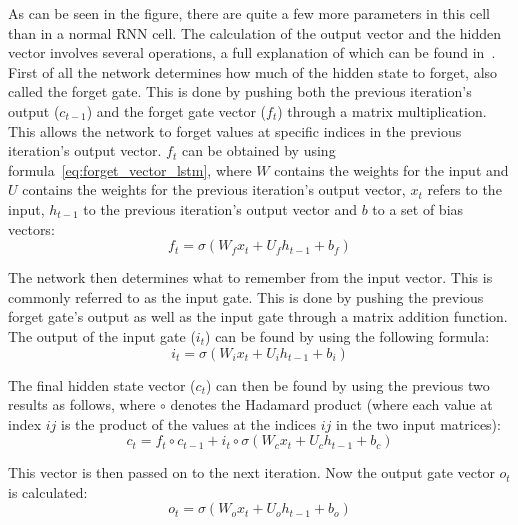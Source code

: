             As can be seen in the figure, there are quite a few more parameters in this cell than in a normal RNN cell. 
            The calculation of the output vector and the hidden vector involves several operations, a full explanation of which can be found in~\cite{olah2015understanding}. 
            First of all the network determines how much of the hidden state to forget, also called the forget gate. 
            This is done by pushing both the previous iteration's output (\(c_{t-1}\)) and the forget gate vector (\(f_t\)) through a matrix multiplication. 
            This allows the network to forget values at specific indices in the previous iteration's output vector. 
            \(f_t\) can be obtained by using formula~\ref{eq:forget_vector_lstm}, where \(W\) contains the weights for the input and \(U\) contains the weights for the previous iteration's output vector, \(x_t\) refers to the input, \(h_{t-1}\) to the previous iteration's output vector and \(b\) to a set of bias vectors:
            \begin{equation} \label{eq:forget_vector_lstm}
                f_t = \sigma(W_f x_t + U_f h_{t-1} + b_f)
            \end{equation}

            The network then determines what to remember from the input vector.
            This is commonly referred to as the input gate. 
            This is done by pushing the previous forget gate's output as well as the input gate through a matrix addition function. 
            The output of the input gate (\(i_t\)) can be found by using the following formula:
            \begin{equation} \label{eq:input_vector_lstm}
                i_t = \sigma(W_i x_t + U_i h_{t-1} + b_i)
            \end{equation}

            The final hidden state vector (\(c_t\)) can then be found by using the previous two results as follows, where \(\circ \) denotes the Hadamard product (where each value at index \(ij\) is the product of the values at the indices \(ij\) in the two input matrices): 
            \begin{equation} \label{eq:hidden_state_vector_lstm}
                c_t = f_t \circ c_{t-1} + i_t \circ \sigma(W_c x_t + U_c h_{t-1} + b_c)
            \end{equation}

            This vector is then passed on to the next iteration. 
            Now the output gate vector \(o_t\) is calculated:
            \begin{equation} \label{eq:output_gate_lstm}
                o_t = \sigma(W_o x_t + U_o h_{t-1} + b_o)
            \end{equation}

